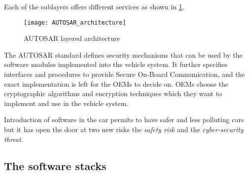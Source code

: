 Each of the sublayers offers different services as shown in \ref{fig:AUTOSAR_archi}. 

\FloatBarrier
\begin{figure}
    \texttt{[image: AUTOSAR\_architecture]}
    \caption{AUTOSAR layered architecture}
    \label{fig:AUTOSAR_archi}
\end{figure}
\FloatBarrier

The AUTOSAR standard defines security mechanisms that can be used by the software modules implemented into the vehicle system. It further specifies interfaces and procedures to provide Secure On-Board Communication, and the exact implementation is left for the OEMs to decide on. OEMs choose the cryptographic algorithms and encryption techniques which they want to implement and use in the vehicle system.


Introduction of software in the car permits to have safer and less polluting cars but it has open the door at two new risks the \emph{safety risk} and the \emph{cyber-security threat}. 


\subsection {The software stacks}

